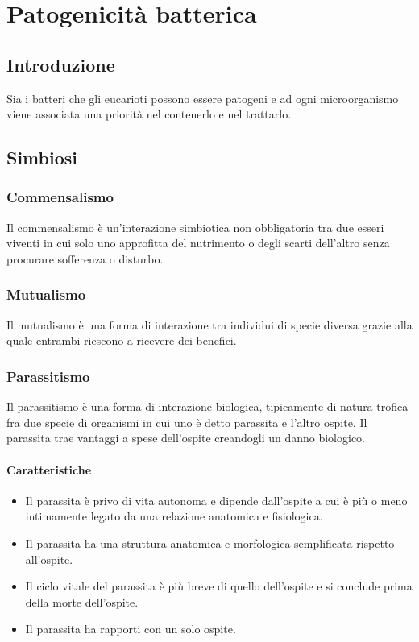 \chapter{Patogenicit\`a batterica}

\section{Introduzione}
Sia i batteri che gli eucarioti possono essere patogeni e ad ogni microorganismo viene associata una priorit\`a nel contenerlo e nel trattarlo.

\section{Simbiosi}

	\subsection{Commensalismo}
	Il commensalismo \`e un'interazione simbiotica non obbligatoria tra due esseri viventi in cui solo uno approfitta del nutrimento o degli scarti dell'altro senza procurare sofferenza o disturbo.

	\subsection{Mutualismo}
	Il mutualismo \`e una forma di interazione tra individui di specie diversa grazie alla quale entrambi riescono a ricevere dei benefici.

	\subsection{Parassitismo}
	Il parassitismo \`e una forma di interazione biologica, tipicamente di natura trofica fra due specie di organismi in cui uno \`e detto parassita e l'altro ospite.
	Il parassita trae vantaggi a spese dell'ospite creandogli un danno biologico.

		\subsubsection{Caratteristiche}
		\begin{multicols}{2}
			\begin{itemize}
				\item Il parassita \`e privo di vita autonoma e dipende dall'ospite a cui \`e pi\`u o meno intimamente legato da una relazione anatomica e fisiologica.
				\item Il parassita ha una struttura anatomica e morfologica semplificata rispetto all'ospite.
				\item Il ciclo vitale del parassita \`e pi\`u breve di quello dell'ospite e si conclude prima della morte dell'ospite.
				\item Il parassita ha rapporti con un solo ospite.
			\end{itemize}
		\end{multicols}
	
